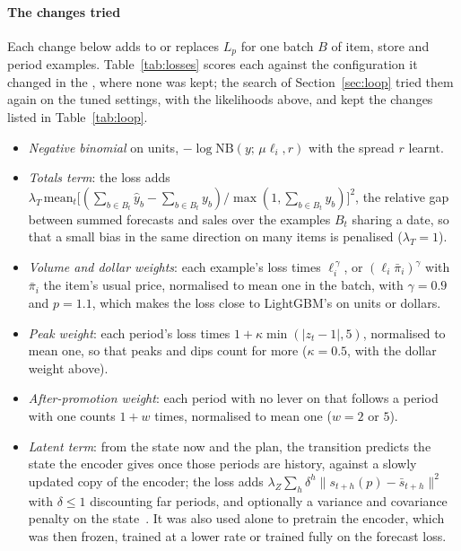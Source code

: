 \paragraph{The changes tried}
Each change below adds to or replaces $L_p$ for one batch $B$ of item, store and
period examples. Table~\ref{tab:losses} scores each against the configuration it
changed in the \firstver{}, where none was kept; the search of
Section~\ref{sec:loop} tried them again on the tuned settings, with the
likelihoods above, and kept the changes listed in Table~\ref{tab:loop}.
\begin{itemize}\setlength{\itemsep}{1pt}
\item \emph{Negative binomial} on units, $-\log\mathrm{NB}(y;\,\mu\ell_i, r)$
with the spread $r$ learnt.
\item \emph{Totals term}: the loss adds
$\lambda_T\,\mathrm{mean}_t\big[(\sum_{b\in B_t}\hat y_b - \sum_{b\in B_t} y_b) /
\max(1, \sum_{b\in B_t} y_b)\big]^2$, the relative gap between summed forecasts
and sales over the examples $B_t$ sharing a date, so that a small bias in the
same direction on many items is penalised ($\lambda_T = 1$).
\item \emph{Volume and dollar weights}: each example's loss times
$\ell_i^{\,\gamma}$, or $(\ell_i\bar\pi_i)^{\gamma}$ with $\bar\pi_i$ the item's
usual price, normalised to mean one in the batch, with $\gamma = 0.9$ and
$p = 1.1$, which makes the loss close to LightGBM's on units or dollars.
\item \emph{Peak weight}: each period's loss times
$1 + \kappa\min(|z_t - 1|, 5)$, normalised to mean one, so that peaks and dips
count for more ($\kappa = 0.5$, with the dollar weight above).
\item \emph{After-promotion weight}: each period with no lever on that follows a
period with one counts $1 + w$ times, normalised to mean one ($w = 2$ or $5$).
\item \emph{Latent term}: from the state now and the plan, the transition
predicts the state the encoder gives once those periods are history, against a
slowly updated copy of the encoder; the loss adds
$\lambda_Z \sum_h \delta^h \lVert s_{t+h}(p) - \bar s_{t+h}\rVert^2$ with
$\delta \le 1$ discounting far periods, and optionally a variance and covariance
penalty on the state~\cite{vicreg}. It was also used alone to pretrain the
encoder, which was then frozen, trained at a lower rate or trained fully on the
forecast loss.
\end{itemize}


